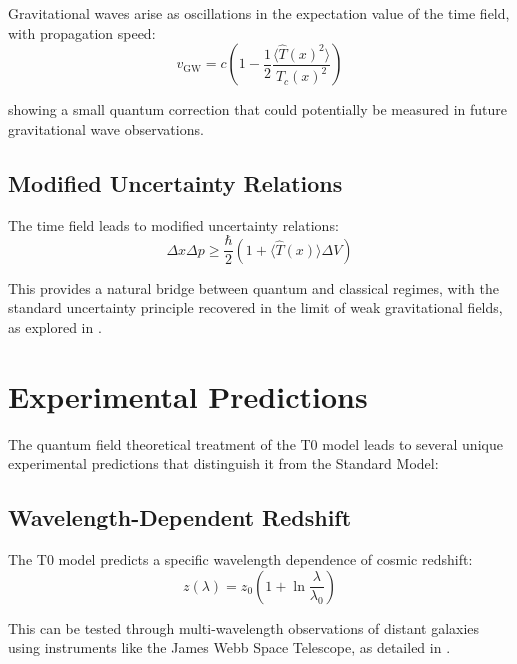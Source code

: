 \documentclass[12pt,a4paper]{article}
\begin{document}
	Gravitational waves arise as oscillations in the expectation value of the time field, with propagation speed:
	\begin{equation}
		v_{\text{GW}} = c\left(1 - \frac{1}{2}\frac{\langle \hat{T}(x)^2 \rangle}{T_c(x)^2}\right)
		\label{eq:gw_speed}
	\end{equation}
	
	showing a small quantum correction that could potentially be measured in future gravitational wave observations.
	
	\subsection{Modified Uncertainty Relations}
	\label{subsec:uncertainty}
	
	The time field leads to modified uncertainty relations:
	\begin{equation}
		\Delta x \Delta p \geq \frac{\hbar}{2}\left(1 + \langle \hat{T}(x) \rangle \Delta V\right)
		\label{eq:uncertainty}
	\end{equation}
	
	This provides a natural bridge between quantum and classical regimes, with the standard uncertainty principle recovered in the limit of weak gravitational fields, as explored in \cite{Pascher2025Extensions}.
	
	\section{Experimental Predictions}
	\label{sec:predictions}
	
	The quantum field theoretical treatment of the T0 model leads to several unique experimental predictions that distinguish it from the Standard Model:
	
	\subsection{Wavelength-Dependent Redshift}
	\label{subsec:redshift_prediction}
	
	The T0 model predicts a specific wavelength dependence of cosmic redshift:
	\begin{equation}
		z(\lambda) = z_0\left(1 + \ln\frac{\lambda}{\lambda_0}\right)
		\label{eq:redshift_prediction}
	\end{equation}
	
	This can be tested through multi-wavelength observations of distant galaxies using instruments like the James Webb Space Telescope, as detailed in \cite{Pascher2025Measurements}.
	
\end{document}
